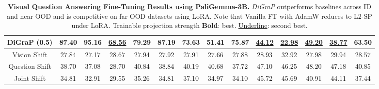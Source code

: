 \begin{table}[!h]
{\begin{tabular}{@{}c|cccccccc|cccc|c@{}}
        DiGraP (0.5)  &
          \multicolumn{1}{c|}{\textbf{87.40}} &
           \textbf{95.16} &
          \multicolumn{1}{c|}{\underline{68.56}} &
          \multicolumn{1}{c|}{\textbf{79.29}} &
          \multicolumn{1}{c|}{\textbf{87.19}} &
          \multicolumn{1}{c|}{\textbf{73.63}} &
          \multicolumn{1}{c|}{\textbf{51.41}} &
          \textbf{75.87} &
          \underline{44.12} &
          \underline{22.98} &
          \multicolumn{1}{c|}{\underline{49.20}}  &
          \multicolumn{1}{c|}{\underline{38.77}} &
          \textbf{63.50}
          \\
        
           \midrule

        {Vision Shift}  &
        \multicolumn{1}{c|}{27.84} &
           27.17 &
          \multicolumn{1}{c|}{28.67} &
          \multicolumn{1}{c|}{27.94} &
          \multicolumn{1}{c|}{27.92} &
          \multicolumn{1}{c|}{27.91} &
          \multicolumn{1}{c|}{27.66} & 27.88
          &
          \multicolumn{1}{c}{28.93} &
          \multicolumn{1}{c}{32.92} &
          \multicolumn{1}{c|}{27.98}  &
          \multicolumn{1}{c|}{29.94} &
          28.57
          \\

        {Question Shift} &
        \multicolumn{1}{c|}{38.70} &
           37.08 &
          \multicolumn{1}{c|}{28.70} &
          \multicolumn{1}{c|}{40.84} &
          \multicolumn{1}{c|}{38.84} &
          \multicolumn{1}{c|}{40.19} &
          \multicolumn{1}{c|}{40.68} &
          37.72
          &
          \multicolumn{1}{c}{47.10} &
          \multicolumn{1}{c}{46.25} &
          \multicolumn{1}{c|}{48.20}  &
          \multicolumn{1}{c|}{47.18} &
          40.85
          \\

          {Joint Shift} &
        \multicolumn{1}{c|}{34.81} &
           32.91 &
          \multicolumn{1}{c|}{29.55} &
          \multicolumn{1}{c|}{35.26} &
          \multicolumn{1}{c|}{34.81} &
          \multicolumn{1}{c|}{37.10} &
          \multicolumn{1}{c|}{34.97} &
          34.10
          &
          \multicolumn{1}{c}{45.72} &
          \multicolumn{1}{c}{45.69} &
          \multicolumn{1}{c|}{40.91}  &
          \multicolumn{1}{c|}{44.11} &
          37.44
          \\

        
        \bottomrule
        \end{tabular}}
          \caption{\textbf{Visual Question Answering Fine-Tuning Results using PaliGemma-3B.} \emph{DiGraP} outperforms baselines across ID and near OOD and is competitive on far OOD datasets using LoRA. Note that Vanilla FT with AdamW reduces to L2-SP under LoRA. Trainable projection strength \textbf{Bold}: best. \underline{Underline}: second best.}
          \label{tab:main_result}
      \end{table}